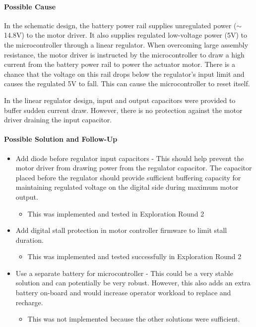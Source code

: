 \paragraph{Possible Cause}

In the schematic design, the battery power rail supplies unregulated power ($\sim$ 14.8V) to the motor driver. It also supplies regulated low-voltage power (5V) to the microcontroller through a linear regulator. When overcoming large assembly resistance, the motor driver is instructed by the microcontroller to draw a high current from the battery power rail to power the actuator motor. There is a chance that the voltage on this rail drops below the regulator’s input limit and causes the regulated 5V to fall. This can cause the microcontroller to reset itself.

In the linear regulator design, input and output capacitors were provided to buffer sudden current draw. However, there is no protection against the motor driver draining the input capacitor.

\paragraph{Possible Solution and Follow-Up}

\begin{itemize}[nosep]
    \item Add diode before regulator input capacitors - This should help prevent the motor driver from drawing power from the regulator capacitor. The capacitor placed before the regulator should provide sufficient buffering capacity for maintaining regulated voltage on the digital side during maximum motor output.
    \begin{itemize}
        \item This was implemented and tested in Exploration Round 2 
    \end{itemize}
    \item Add digital stall protection in motor controller firmware to limit stall duration. 
    \begin{itemize}
        \item This was implemented and tested successfully in Exploration Round 2 
    \end{itemize}
    \item Use a separate battery for microcontroller - This could be a very stable solution and can potentially be very robust. However, this also adds an extra battery on-board and would increase operator workload to replace and recharge. 
    \begin{itemize}
        \item This was not implemented because the other solutions were sufficient.
    \end{itemize}
\end{itemize}

